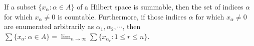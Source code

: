 If a subset $\{x_\alpha : \alpha \in A\}$ of a Hilbert space is summable, then the set of indices $\alpha$ for which $x_\alpha \neq 0$ is countable. Furthermore, if those indices $\alpha$ for which $x_\alpha \neq 0$ are enumerated arbitrarily as $\alpha_1, \alpha_2, \cdots$, then $\sum \{x_\alpha : \alpha \in A\} = \lim_{n \to \infty} \sum \{x_{\alpha_r} : 1 \leq r \leq n\}$.
